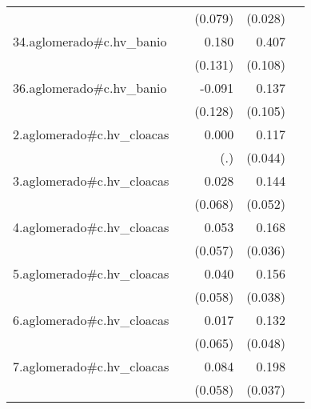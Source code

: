 {\begin{longtable}{l*{4}{D{.}{.}{-1}}}
            &                     &     (0.079)         &     (0.028)         &                     \\
\addlinespace
34.aglomerado#c.hv\_banio&                     &       0.180         &       0.407\sym{***}&                     \\
            &                     &     (0.131)         &     (0.108)         &                     \\
\addlinespace
36.aglomerado#c.hv\_banio&                     &      -0.091         &       0.137         &                     \\
            &                     &     (0.128)         &     (0.105)         &                     \\
\addlinespace
2.aglomerado#c.hv\_cloacas&                     &       0.000         &       0.117\sym{**} &                     \\
            &                     &         (.)         &     (0.044)         &                     \\
\addlinespace
3.aglomerado#c.hv\_cloacas&                     &       0.028         &       0.144\sym{**} &                     \\
            &                     &     (0.068)         &     (0.052)         &                     \\
\addlinespace
4.aglomerado#c.hv\_cloacas&                     &       0.053         &       0.168\sym{***}&                     \\
            &                     &     (0.057)         &     (0.036)         &                     \\
\addlinespace
5.aglomerado#c.hv\_cloacas&                     &       0.040         &       0.156\sym{***}&                     \\
            &                     &     (0.058)         &     (0.038)         &                     \\
\addlinespace
6.aglomerado#c.hv\_cloacas&                     &       0.017         &       0.132\sym{**} &                     \\
            &                     &     (0.065)         &     (0.048)         &                     \\
\addlinespace
7.aglomerado#c.hv\_cloacas&                     &       0.084         &       0.198\sym{***}&                     \\
            &                     &     (0.058)         &     (0.037)         &                     \\

\end{longtable}}
